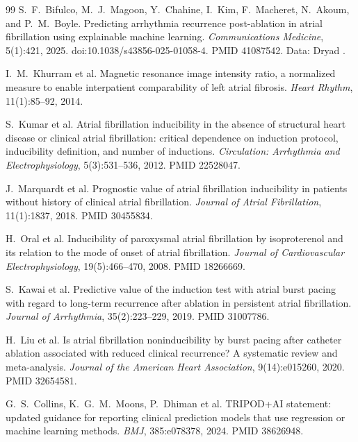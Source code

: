 \begin{thebibliography}{99}
 S.~F.~Bifulco, M.~J.~Magoon, Y.~Chahine, I.~Kim,
F.~Macheret, N.~Akoum, and P.~M.~Boyle. Predicting arrhythmia
recurrence post-ablation in atrial fibrillation using explainable machine
learning. \emph{Communications Medicine}, 5(1):421, 2025.
doi:10.1038/s43856-025-01058-4. PMID 41087542.
Data: Dryad .

 I.~M.~Khurram et al. Magnetic resonance image intensity
ratio, a normalized measure to enable interpatient comparability of left atrial
fibrosis. \emph{Heart Rhythm}, 11(1):85--92, 2014.

 S.~Kumar et al. Atrial fibrillation inducibility in the
absence of structural heart disease or clinical atrial fibrillation: critical
dependence on induction protocol, inducibility definition, and number of
inductions. \emph{Circulation: Arrhythmia and Electrophysiology}, 5(3):531--536,
2012. PMID 22528047.

 J.~Marquardt et al. Prognostic value of atrial
fibrillation inducibility in patients without history of clinical atrial
fibrillation. \emph{Journal of Atrial Fibrillation}, 11(1):1837, 2018.
PMID 30455834.

 H.~Oral et al. Inducibility of paroxysmal atrial fibrillation
by isoproterenol and its relation to the mode of onset of atrial fibrillation.
\emph{Journal of Cardiovascular Electrophysiology}, 19(5):466--470, 2008.
PMID 18266669.

 S.~Kawai et al. Predictive value of the induction test with
atrial burst pacing with regard to long-term recurrence after ablation in
persistent atrial fibrillation. \emph{Journal of Arrhythmia}, 35(2):223--229,
2019. PMID 31007786.

 H.~Liu et al. Is atrial fibrillation noninducibility by burst
pacing after catheter ablation associated with reduced clinical recurrence? A
systematic review and meta-analysis. \emph{Journal of the American Heart
Association}, 9(14):e015260, 2020. PMID 32654581.

 G.~S.~Collins, K.~G.~M.~Moons, P.~Dhiman et al.
TRIPOD+AI statement: updated guidance for reporting clinical prediction models
that use regression or machine learning methods. \emph{BMJ}, 385:e078378, 2024.
PMID 38626948.
\end{thebibliography}